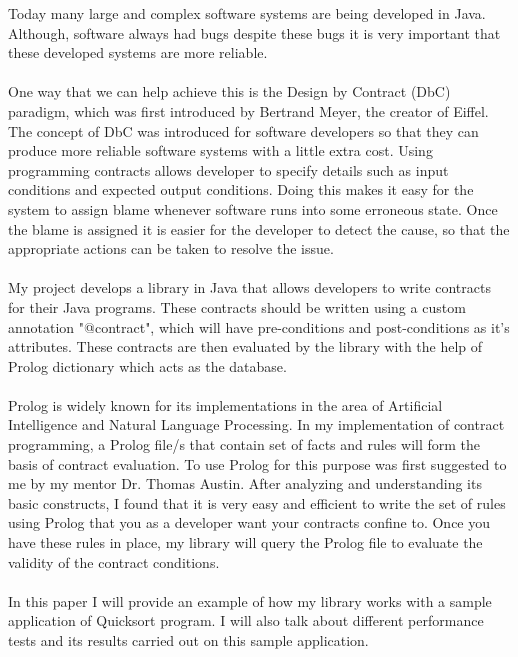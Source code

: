 Today many large and complex software systems are being developed in Java. Although, software
always had bugs despite these bugs it is very important that these developed 
systems are more reliable. 
\paragraph{}
One way that we can help achieve this is the Design by Contract
(DbC) paradigm, which was first introduced by Bertrand Meyer, the
creator of Eiffel.
The concept of DbC was introduced for software developers so that they
can produce more reliable software systems with a little extra cost.
Using programming contracts allows developer to specify details
such as input conditions and expected output conditions. Doing this
makes it easy for the system to assign blame whenever software runs
into some erroneous state. Once the blame is assigned it is easier for
the developer to detect the cause, so that the appropriate actions can
be taken to resolve the issue. 
\paragraph{} 
My project develops a library in Java that allows 
developers to write contracts for their Java programs. These contracts should be written using a custom annotation "@contract", which will have pre-conditions and post-conditions as it's attributes. These contracts are then evaluated
by the library with the help of Prolog dictionary which acts as the database. 
\paragraph{}
Prolog is widely known for its implementations in the area of Artificial Intelligence and Natural Language Processing. In my implementation of contract programming, a Prolog file/s that contain set of facts and rules will form the basis of contract evaluation. To use Prolog for this purpose was first suggested to me by my mentor Dr. Thomas Austin. After analyzing and understanding its basic constructs, I found that it is very easy and efficient to write the set of rules using Prolog that you as a developer want your contracts confine to. Once you have these rules in place, my library will query the Prolog file to evaluate the validity of the contract conditions.
\paragraph{}
In this paper I will provide an example of how my library works with a sample application of Quicksort program. I will also talk about different performance tests and its results carried out on this sample application.       
